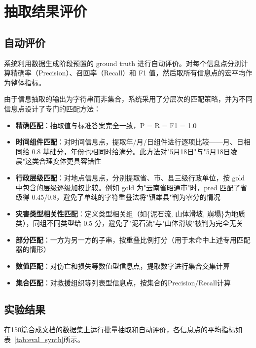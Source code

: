 \documentclass[12pt, a4paper]{ctexart}
\begin{document}
\section{抽取结果评价}

\subsection{自动评价}

系统利用数据生成阶段预置的 ground truth 进行自动评价。对每个信息点分别计算精确率（Precision）、召回率（Recall）和 F1 值，然后取所有信息点的宏平均作为整体指标。

由于信息抽取的输出为字符串而非集合，系统采用了分层次的匹配策略，并为不同信息点设计了专门的匹配方法：
\begin{itemize}[itemsep=2pt]
    \item \textbf{精确匹配}：抽取值与标准答案完全一致，P = R = F1 = 1.0
    \item \textbf{时间组件匹配}：对时间信息点，提取年/月/日组件进行逐项比较——月、日相同给 0.8 基础分，年份也相同时给满分。此方法对"5月18日"与"5月18日凌晨"这类合理变体更具容错性
    \item \textbf{行政层级匹配}：对地点信息点，分别提取省、市、县三级行政单位，按 gold 中包含的层级逐级加权比较。例如 gold 为"云南省昭通市"时，pred 匹配了省级得 0.45/0.8，避免了单纯的字符重叠法将"镇雄县"判为零分的情况
    \item \textbf{灾害类型相关性匹配}：定义类型相关组（如\{泥石流, 山体滑坡, 崩塌\}为地质类），同组不同类型给 0.5 分，避免了"泥石流"与"山体滑坡"被判为完全无关
    \item \textbf{部分匹配}：一方为另一方的子串，按重叠比例打分（用于未命中上述专用匹配器的情形）
    \item \textbf{数值匹配}：对伤亡和损失等数值型信息点，提取数字进行集合交集计算
    \item \textbf{集合匹配}：对救援组织等列表型信息点，按集合的Precision/Recall计算
\end{itemize}

\subsection{实验结果}

在150篇合成文档的数据集上运行批量抽取和自动评价，各信息点的平均指标如表~\ref{tab:eval_synth}所示。
\end{document}
